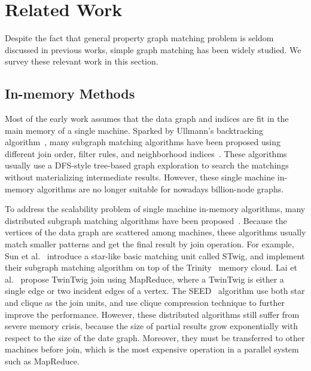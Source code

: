 \section{Related Work}
Despite the fact that general property graph matching problem is seldom discussed in previous works,
simple graph matching has been widely studied.
We survey these relevant work in this section.
\subsection*{In-memory Methods}
Most of the early work assumes that the data graph and indices are fit in the main memory of a single machine.
Sparked by Ullmann's backtracking algorithm~\cite{DBLP:journals/jacm/Ullmann76},
many subgraph matching algorithms have been proposed using different join order, filter rules, and neighborhood indices~\cite{DBLP:journals/pami/CordellaFSV04,DBLP:journals/pvldb/ShangZLY08,DBLP:conf/sigmod/HeS08,DBLP:conf/sigmod/HanLL13,DBLP:journals/pvldb/LeeHKL12}.
These algorithms usually use a DFS-style tree-based graph exploration to search the matchings without materializing intermediate results.
However, these single machine in-memory algorithms are no longer suitable for nowadays billion-node graphs.

To address the scalability problem of single machine in-memory algorithms,
many distributed subgraph matching algorithms have been proposed~\cite{DBLP:journals/pvldb/SunWWSL12,DBLP:conf/sigmod/ShaoCCMYX14,DBLP:journals/pvldb/LaiQLC15,DBLP:journals/pvldb/LaiQLZC16,DBLP:conf/cloud/SerafiniMS17}.
Because the vertices of the data graph are scattered among machines,
these algorithms usually match smaller patterns and get the final result by join operation.
For example, Sun et al.~\cite{DBLP:journals/pvldb/SunWWSL12} introduce a star-like basic matching unit called STwig,
and implement their subgraph matching algorithm on top of the Trinity~\cite{shao2012the} memory cloud.
Lai et al.~\cite{DBLP:journals/pvldb/LaiQLC15} propose TwinTwig join using MapReduce,
where a TwinTwig is either a single edge or two incident edges of a vertex.
The SEED~\cite{DBLP:journals/pvldb/LaiQLZC16} algorithm use both star and clique as the join units,
and use clique compression technique to further improve the performance.
However, these distributed algorithms still suffer from severe memory crisis,
because the size of partial results grow exponentially with respect to the size of the date graph.
Moreover, they must be transferred to other machines before join,
which is the most expensive operation in a parallel system such as MapReduce.

